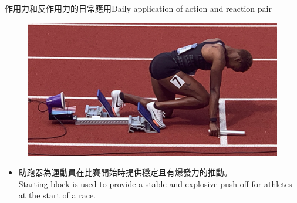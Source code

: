 \documentclass[beamer=true]{standalone}
\begin{document}
\begin{frame}{作用力和反作用力的日常應用Daily application of action and reaction pair}
    \begin{figure}[h!]
        \centering
        \includegraphics[width=.8\textwidth]{assets/60a0e41a.png}
    \end{figure}
    \begin{itemize}
        \item 助跑器為運動員在比賽開始時提供穩定且有爆發力的推動。\\Starting block is used to provide a stable and explosive push-off for athletes at the start of a race.
    \end{itemize}
\end{frame}
\end{document}
